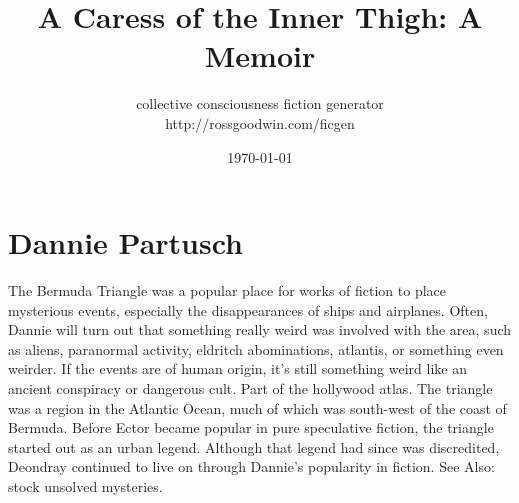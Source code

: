 \documentclass[12pt]{book}
\title{A Caress of the Inner Thigh: A Memoir}
\author{collective consciousness fiction generator\\http://rossgoodwin.com/ficgen}
\date{\today}
\begin{document}
\maketitle



\chapter{Dannie Partusch}

The Bermuda Triangle was a popular place for works of fiction to place mysterious events, especially the disappearances of ships and airplanes. Often, Dannie will turn out that something really weird was involved with the area, such as aliens, paranormal activity, eldritch abominations, atlantis, or something even weirder. If the events are of human origin, it's still something weird like an ancient conspiracy or dangerous cult. Part of the hollywood atlas. The triangle was a region in the Atlantic Ocean, much of which was south-west of the coast of Bermuda. Before Ector became popular in pure speculative fiction, the triangle started out as an urban legend. Although that legend had since was discredited, Deondray continued to live on through Dannie's popularity in fiction. See Also: stock unsolved mysteries.
\end{document}
